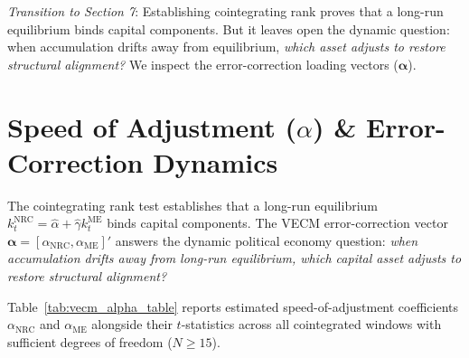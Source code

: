 \documentclass[11pt,a4paper]{article}
\begin{document}
\textit{Transition to Section 7}: Establishing cointegrating rank proves that a long-run equilibrium binds capital components. But it leaves open the dynamic question: when accumulation drifts away from equilibrium, \textit{which asset adjusts to restore structural alignment?} We inspect the error-correction loading vectors ($\boldsymbol{\alpha}$).

\FloatBarrier
\section{Speed of Adjustment ($\alpha$) \& Error-Correction Dynamics}

The cointegrating rank test establishes that a long-run equilibrium $k_t^{\text{NRC}} = \hat{\alpha} + \hat{\gamma} k_t^{\text{ME}}$ binds capital components. The VECM error-correction vector $\boldsymbol{\alpha} = [\alpha_{\text{NRC}}, \alpha_{\text{ME}}]'$ answers the dynamic political economy question: \textit{when accumulation drifts away from long-run equilibrium, which capital asset adjusts to restore structural alignment?}

Table~\ref{tab:vecm_alpha_table} reports estimated speed-of-adjustment coefficients $\alpha_{\text{NRC}}$ and $\alpha_{\text{ME}}$ alongside their $t$-statistics across all cointegrated windows with sufficient degrees of freedom ($N \ge 15$).
\end{document}
